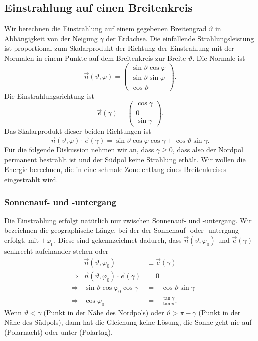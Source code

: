 %
%
%
\subsection{Einstrahlung auf einen Breitenkreis}
Wir berechnen die Einstrahlung auf einem gegebenen Breitengrad
$\vartheta$ in Abhängigkeit von der Neigung $\gamma$
der Erdachse.
Die einfallende Strahlungsleistung ist proportional zum Skalarprodukt
der Richtung der Einstrahlung mit der Normalen in einem Punkte
auf dem Breitenkreis zur Breite $\vartheta$.
Die Normale ist
\[
\vec n(\vartheta,\varphi)
=
\begin{pmatrix}
\sin\vartheta\cos\varphi\\
\sin\vartheta\sin\varphi\\
\cos\vartheta
\end{pmatrix}.
\]
Die Einstrahlungsrichtung ist
\[
\vec e(\gamma)
=
\begin{pmatrix}
\cos\gamma\\
0\\
\sin\gamma
\end{pmatrix}.
\]
Das Skalarprodukt dieser beiden Richtungen ist
\begin{equation}
\vec n(\vartheta,\varphi)\cdot\vec e(\gamma)
=
\sin\vartheta\cos\varphi\cos\gamma
+
\cos\vartheta\sin\gamma.
\label{skript:einstrahlung:skalarprodukt}
\end{equation}
Für die folgende Diskussion nehmen wir an, dass $\gamma \ge 0$,
dass also der Nordpol permanent bestrahlt ist und der Südpol keine
Strahlung erhält.
Wir wollen die Energie berechnen, die in eine schmale Zone
entlang eines Breitenkreises eingestrahlt wird.

\subsubsection{Sonnenauf- und -untergang}
Die Einstrahlung erfolgt natürlich nur zwischen Sonnenauf- und
-untergang.
Wir bezeichnen die geographische Länge, bei der der Sonnenauf- oder
-untergang erfolgt, mit $\pm\varphi_0$.
Diese sind gekennzeichnet dadurch, dass $\vec n(\vartheta,\varphi_0)$ und
$\vec e(\gamma)$ senkrecht aufeinander stehen oder
\begin{equation*}
\begin{aligned}
&&
\vec n(\vartheta,\varphi_0)&\perp \vec e(\gamma)
\\
&\Rightarrow&
\vec n(\vartheta,\varphi_0)\cdot \vec e(\gamma)&=0
\\
&\Rightarrow&
\sin\vartheta\cos\varphi_0\cos\gamma
&=
-
\cos\vartheta\sin\gamma
\\
&\Rightarrow&
\cos\varphi_0
&=
-\frac{\tan\gamma}{\tan\vartheta}.
\end{aligned}
\end{equation*}
Wenn $\vartheta < \gamma$ (Punkt in der Nähe des Nordpols) oder
$\vartheta > \pi - \gamma$ (Punkt in der Nähe des Südpols),
dann hat die Gleichung keine Lösung,
die Sonne geht nie auf (Polarnacht) oder unter (Polartag).

